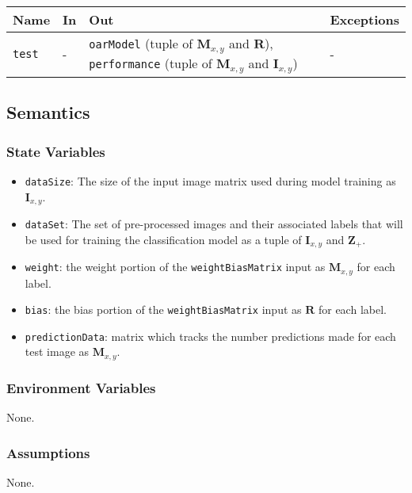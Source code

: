 \documentclass[12pt, titlepage]{article}
\def\code#1{\texttt{#1}}
\begin{document}
\begin{center}
\begin{tabular}{p{2cm} p{4cm} p{4cm} p{2cm}}
\hline
\textbf{Name} & \textbf{In} & \textbf{Out} & \textbf{Exceptions} \\
\hline
\code{test} & - & \code{oarModel} (tuple of $\mathbf{M}_{x, y}$ and $\mathbf{R}$), \code{performance} (tuple of $\mathbf{M}_{x, y}$ and $\mathbf{I}_{x, y}$) & - \\
\hline
\end{tabular}
\end{center}

\subsection{Semantics}

\subsubsection{State Variables}

\begin{itemize}
  \item \code{dataSize}: The size of the input image matrix used during model training as $\mathbf{I}_{x,y}$.
  \item \code{dataSet}: The set of pre-processed images and their associated labels that will be used for training the classification model as a tuple of $\mathbf{I}_{x,y}$ and $\mathbf{Z}_{+}$.
  \item \code{weight}: the weight portion of the \code{weightBiasMatrix} input as $\mathbf{M}_{x,y}$ for each label.
  \item \code{bias}: the bias portion of the \code{weightBiasMatrix} input as $\mathbf{R}$ for each label.
  \item \code{predictionData}: matrix which tracks the number predictions made for each test image as $\mathbf{M}_{x,y}$.
\end{itemize}

\subsubsection{Environment Variables}

None.

\subsubsection{Assumptions}

None.
\end{document}
